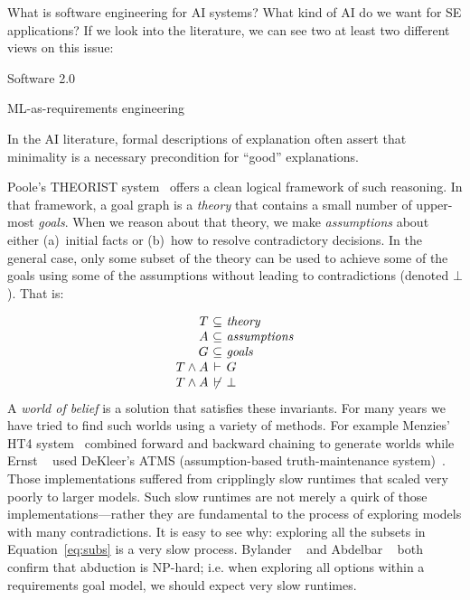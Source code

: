 
What is software engineering for AI systems? What kind of AI do we want for SE applications? If we look into
 the literature, we can see two at least  two different views on this issue:
 \bi
 \item Software 2.0
 \item ML-as-requirements engineering
 \ei
 
  
 In the AI literature, formal descriptions of explanation
 often assert that minimality is a necessary precondition for ``good'' explanations.


Poole's THEORIST system~\cite{Poole1994WhoCT} offers a clean logical framework of such reasoning.
In that framework, a goal graph is a  {\em theory} that contains a small number of upper-most {\em goals}. When we reason about that theory, we make {\em assumptions}
about either (a)~initial facts or (b)~how to resolve contradictory decisions. In the general case, only some subset of the theory can be used to achieve some of the goals using some of the assumptions without
leading to contradictions (denoted $\bot$). That is:


    {\small \begin{equation}\label{eq:subs}
     \begin{array}{r@{~}c@{~}l}
       T &\subseteq& \mathit{theory} \\
       A &\subseteq& \mathit{assumptions}\\    
       G &\subseteq& \mathit{goals}\\
       T \wedge A&  \vdash & G\\
       T \wedge A & \not\vdash& \bot
       \end{array}
     \end{equation}}
     A {\em world of belief} is a solution that
     satisfies these invariants.
     For many years we have tried to find such worlds using a variety of
     methods. For example Menzies' HT4 system~\cite{menzies1996applications}
     combined forward and backward chaining to generate worlds while Ernst \etal~\cite{ernst12caise} used DeKleer's ATMS (assumption-based truth-maintenance system)~\cite{de1986assumption}.
Those implementations suffered
from cripplingly slow runtimes that scaled very poorly to larger models. Such slow runtimes are not merely a quirk of those implementations---rather they are fundamental to the process of exploring models with many contradictions.
It is easy to see why:
exploring all the subsets in Equation~\ref{eq:subs} is a very slow process.
     Bylander \etal~\cite{Bylander1991}  and
     Abdelbar \etal~\cite{Abdelbar:2004} both confirm that abduction is NP-hard;
     i.e. when exploring all options within a requirements goal model, we should expect very slow runtimes.



